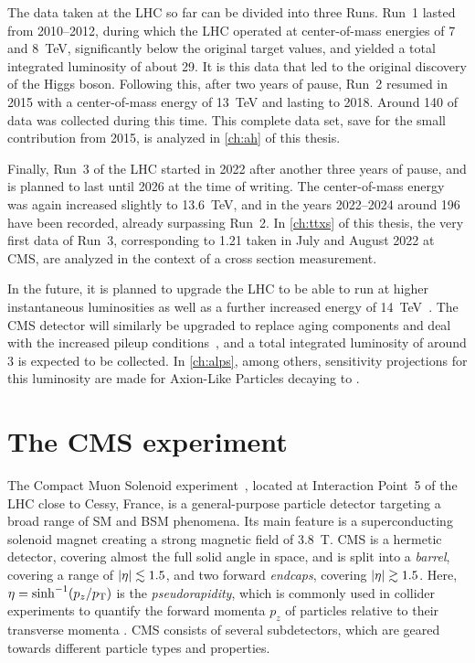 The data taken at the LHC so far can be divided into three Runs. Run~1 lasted from 2010--2012, during which the LHC operated at center-of-mass energies of 7 and 8~TeV, significantly below the original target values, and yielded a total integrated luminosity of about \SI{29}{\fbinv}. It is this data that led to the original discovery of the Higgs boson. Following this, after two years of pause, Run~2 resumed in 2015 with a center-of-mass energy of 13~TeV and lasting to 2018. Around \SI{140}{\fbinv} of data was collected during this time. This complete data set, save for the small contribution from 2015, is analyzed in \cref{ch:ah} of this thesis.

Finally, Run~3 of the LHC started in 2022 after another three years of pause, and is planned to last until 2026 at the time of writing. The center-of-mass energy was again increased slightly to 13.6~TeV, and in the years 2022--2024 around \SI{196}{\fbinv} have been recorded, already surpassing Run~2. In \cref{ch:ttxs} of this thesis, the very first data of Run~3, corresponding to \SI{1.21}{\fbinv} taken in July and August 2022 at CMS, are analyzed in the context of a \ttbar cross section measurement. 

In the future, it is planned to upgrade the LHC to be able to run at higher instantaneous luminosities as well as a further increased energy of 14~TeV~\cite{ZurbanoFernandez:2020cco}. The CMS detector will similarly be upgraded to replace aging components and deal with the increased pileup conditions~\cite{CMS:TDR-15-02,CMS:PRF-21-001}, and a total integrated luminosity of around \SI{3}{\abinv} is expected to be collected. In \cref{ch:alps}, among others, sensitivity projections for this luminosity are made for Axion-Like Particles decaying to \ttbar.

\section{The CMS experiment}
\label{sec:methods:cms}

The Compact Muon Solenoid experiment~\cite{CMS:2008xjf,CMS:PRF-21-001}, located at Interaction Point~5 of the LHC close to Cessy, France, is a general-purpose particle detector targeting a broad range of SM and BSM phenomena. Its main feature is a superconducting solenoid magnet creating a strong magnetic field of 3.8~T. CMS is a hermetic detector, covering almost the full solid angle in space, and is split into a \textit{barrel}, covering a range of $|\eta| \lesssim 1.5$, and two forward \textit{endcaps}, covering $|\eta| \gtrsim 1.5$. 
Here, $\eta = \sinh^{-1} (p_z / p_{\mathrm{T}})$ is the \textit{pseudorapidity}, which is commonly used in collider experiments to quantify the forward momenta $p_z$ of particles relative to their transverse momenta \pt.
CMS consists of several subdetectors, which are geared towards different particle types and properties.

